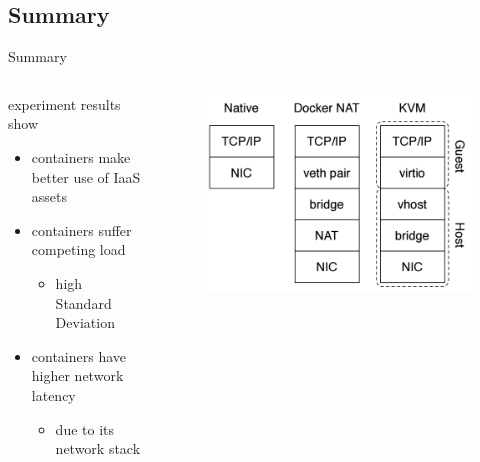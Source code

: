 \subsection{Summary}
\begin{frame}{Summary}
	\begin{columns}
		\begin{column}{0.6\textwidth}
			experiment results show
			\begin{itemize}
				\item{\footnotesize{containers make better use of IaaS assets}}
				\item{\footnotesize{containers suffer competing load}}
				\begin{itemize}
					\item{\scriptsize{high Standard Deviation}}
				\end{itemize}
				\item{\footnotesize{containers have higher network latency}}
				\begin{itemize}
					\item{\scriptsize{due to its network stack}}
				\end{itemize}
			\end{itemize}
		\end{column}
		\begin{column}{0.4\textwidth}
			\begin{figure}
				\centering{}
				\includegraphics[scale=0.4]{images/network-stack.png}
			\end{figure}
		\end{column}
	\end{columns}
\end{frame}